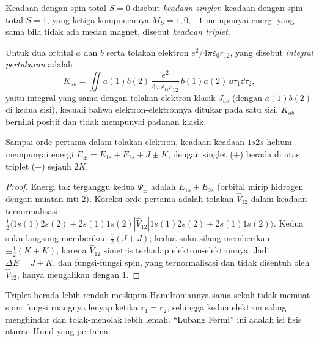 \begin{definition}\label{def:b3:many-electron-atoms:singlet-triplet}
Keadaan dengan spin total $S = 0$ disebut \emph{keadaan singlet};
keadaan dengan spin total $S = 1$, yang ketiga komponennya $M_S = 1, 0, -1$
mempunyai energi yang sama bila tidak ada medan magnet, disebut
\emph{keadaan triplet}.
\end{definition}

\begin{definition}\label{def:b3:many-electron-atoms:exchange}
Untuk dua orbital $a$ dan $b$ serta tolakan elektron $e^2/4\pi\varepsilon_0
r_{12}$, yang disebut \emph{integral pertukaran} adalah
\[
K_{ab} = \iint a(1)b(2)\,\frac{e^2}{4\pi\varepsilon_0r_{12}}\,b(1)a(2)\,\dd\tau_1\dd\tau_2,
\]
yaitu integral yang sama dengan tolakan elektron klasik $J_{ab}$ (dengan
$a(1)b(2)$ di kedua sisi), kecuali bahwa elektron-elektronnya ditukar pada
satu sisi. $K_{ab}$ bernilai positif dan tidak mempunyai padanan klasik.
\end{definition}

\begin{proposition}\label{prop:b3:many-electron-atoms:helium}
Sampai orde pertama dalam tolakan elektron, keadaan-keadaan $1s2s$ helium
mempunyai energi $E_\pm = E_{1s} + E_{2s} + J \pm K$, dengan singlet ($+$)
berada di atas triplet ($-$) sejauh $2K$.
\end{proposition}

\begin{proof}
Energi tak terganggu kedua $\Psi_\pm$ adalah $E_{1s} + E_{2s}$ (orbital mirip
hidrogen dengan muatan inti 2). Koreksi orde pertama adalah 
tolakan $\hat V_{12}$ dalam keadaan ternormalisasi:
$\frac12\langle 1s(1)2s(2) \pm 2s(1)1s(2)|\hat V_{12}|1s(1)2s(2) \pm
2s(1)1s(2)\rangle$. Kedua suku langsung memberikan $\frac12(J + J)$; kedua
suku silang memberikan $\pm\frac12(K + K)$, karena $\hat V_{12}$ simetris
terhadap elektron-elektronnya. Jadi $\Delta E = J \pm K$, dan fungsi-fungsi
spin, yang ternormalisasi dan tidak disentuh oleh $\hat V_{12}$, hanya
mengalikan dengan 1.
\end{proof}

Triplet berada lebih rendah meskipun Hamiltoniannya sama sekali tidak memuat
spin: fungsi ruangnya lenyap ketika $\mathbf r_1 = \mathbf r_2$, sehingga kedua
elektron saling menghindar dan tolak-menolak lebih lemah. ``Lubang Fermi'' ini
adalah isi fisis aturan Hund yang pertama.

